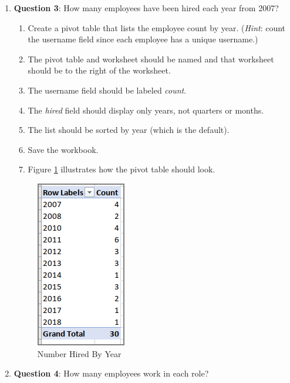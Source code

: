 \begin{enumbox}
\begin{enumerate}
		\item{\textbf{Question 3}: How many employees have been hired each year from 2007?}
	
		\begin{enumerate}
			\item Create a pivot table that lists the employee count by year. (\textit{Hint}: count the username field since each employee has a unique username.)
			\item The pivot table and worksheet should be named  and that worksheet should be to the right of the  worksheet.
			\item The username field should be labeled \textit{count}. 
			\item The \textit{hired} field should display only years, not quarters or months.
			\item The list should be sorted by year (which is the default).
			\item Save the  workbook.
			\item Figure \ref{07:fig60} illustrates how the pivot table should look.
		\end{enumerate}
	
		\begin{figure}[H]
			\centering
			\includegraphics[width=\maxwidth{.50\linewidth}]{gfx/ch07_fig60}
			\caption{Number Hired By Year}
			\label{07:fig60}
		\end{figure}

		\item{\textbf{Question 4}: How many employees work in each role?}
	

\end{enumerate}
\end{enumbox}
